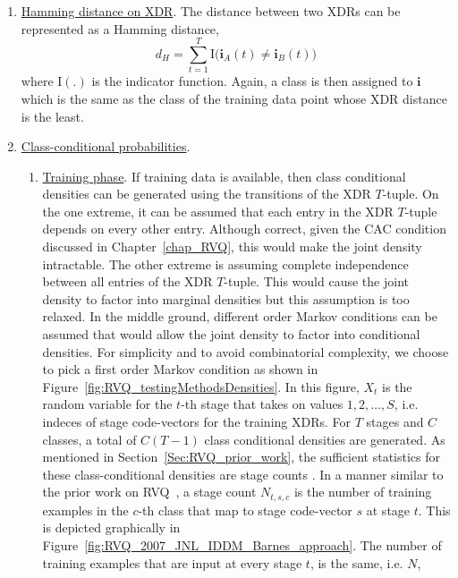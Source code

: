 \begin{enumerate}
\item \underline{Hamming distance on XDR}.  The distance between two XDRs can be represented as a Hamming distance,
\begin{equation}
d_H = \sum\limits_{t=1}^{T}\mathrm{I}\bigg(\mathbf{i}_A(t) \neq \mathbf{i}_B(t)\bigg)
\end{equation}
where $\mathrm{I}(.)$ is the indicator function.  Again, a class is then assigned to $\mathbf{i}$ which is the same as the class of the training data point whose XDR distance is the least.
\item \underline{Class-conditional probabilities}.  
\begin{enumerate}


											\begin{figure}[t]
											\centering
											\caption{PCA (a) average face, (b) eigenfaces, for the Yale face dataset.}
											\label{fig:PCA_eigenfaces_Yale}
											\end{figure}

\item \underline{Training phase}.  If training data is available, then class conditional densities can be generated using the transitions of the XDR $T$-tuple.  On the one extreme, it can be assumed that each entry in the XDR $T$-tuple depends on every other entry.  Although correct, given the CAC condition discussed in Chapter~\ref{chap_RVQ}, this would make the joint density intractable.  The other extreme is assuming complete independence between all entries of the XDR $T$-tuple.  This would cause the joint density to factor into marginal densities but this assumption is too relaxed.  In the middle ground, different order Markov conditions can be assumed that would allow the joint density to factor into conditional densities.  For simplicity and to avoid combinatorial complexity, we choose to pick a first order Markov condition as shown in Figure~\ref{fig:RVQ_testingMethodsDensities}.  In this figure, $X_t$ is the random variable for the $t$-th stage that takes on values $1, 2, \ldots, S$, i.e. indeces of stage code-vectors for the training XDRs.  For $T$ stages and $C$ classes, a total of $C(T-1)$ class conditional densities are generated.  As mentioned in Section~\ref{Sec:RVQ_prior_work}, the sufficient statistics for these class-conditional densities are stage counts \cite{1993_BOOK_SSP_Kay}.  In a manner similar to the prior work on RVQ~\cite{2007_JNL_Katrina_Barnes, 2007_JNL_IDDM_Barnes}, a stage count $N_{t,s,c}$ is the number of training examples in the $c$-th class that map to stage code-vector $s$ at stage $t$.  This is depicted graphically in Figure~\ref{fig:RVQ_2007_JNL_IDDM_Barnes_approach}.  The number of training examples that are input at every stage $t$,  is the same, i.e. $N$,


\end{enumerate}
\end{enumerate}
